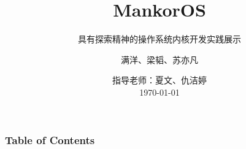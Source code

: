 \documentclass[aspectratio=169]{beamer}
\title{MankorOS}
\subtitle{具有探索精神的操作系统内核开发实践展示}
\author{满洋、梁韬、苏亦凡}
\institute[HITSZ]{哈尔滨工业大学（深圳）}
\date[\today]{ 指导老师：夏文、仇洁婷\\ \vspace{1em} \today}
\begin{document}
\frame{\titlepage}

\begin{frame}
    \frametitle{Table of Contents}
    \tableofcontents
\end{frame}










\end{document}
